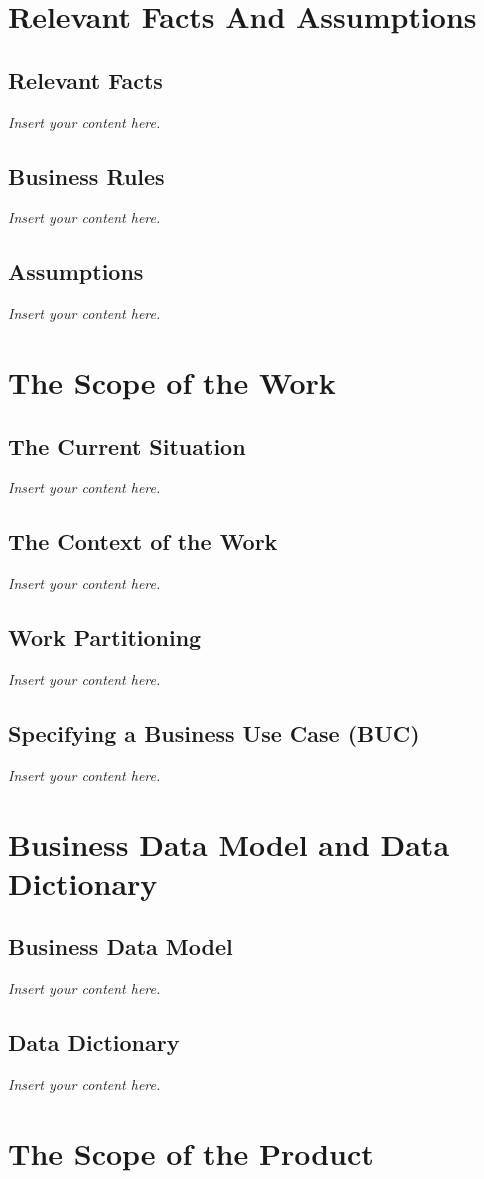 \documentclass[12pt]{article}
\newcommand{\lips}{\textit{Insert your content here.}}
\begin{document}
\section{Relevant Facts And Assumptions}
\subsection{Relevant Facts}
\lips
\subsection{Business Rules}
\lips
\subsection{Assumptions}
\lips

\section{The Scope of the Work}
\subsection{The Current Situation}
\lips
\subsection{The Context of the Work}
\lips
\subsection{Work Partitioning}
\lips
\subsection{Specifying a Business Use Case (BUC)}
\lips

\section{Business Data Model and Data Dictionary}
\subsection{Business Data Model}
\lips
\subsection{Data Dictionary}
\lips

\section{The Scope of the Product}
\end{document}

